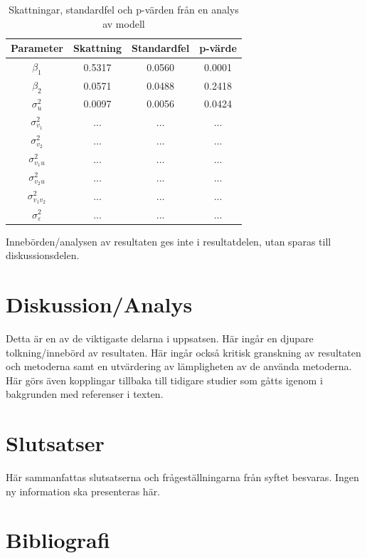 \documentclass[10pt,swedish]{book}
\begin{document}
\begin{table}[H]
\begin{centering}
\begin{tabular}{|c|c|c|c|}
\hline 
Parameter &
Skattning &
Standardfel &
p-värde\tabularnewline
\hline 
\hline 
$\beta_{1}$ &
0.5317 &
0.0560 &
0.0001\tabularnewline
\hline 
$\beta_{2}$ &
0.0571 &
0.0488 &
0.2418\tabularnewline
\hline 
$\sigma_{u}^{2}$ &
0.0097 &
0.0056 &
0.0424\tabularnewline
\hline 
$\sigma_{v_{1}}^{2}$ &
... &
... &
...\tabularnewline
\hline 
$\sigma_{v_{2}}^{2}$ &
... &
... &
...\tabularnewline
\hline 
$\sigma_{v_{1}u}^{2}$ &
... &
... &
...\tabularnewline
\hline 
$\sigma_{v_{2}u}^{2}$ &
... &
... &
...\tabularnewline
\hline 
$\sigma_{v_{1}v_{2}}^{2}$ &
... &
... &
...\tabularnewline
\hline 
$\sigma_{\varepsilon}^{2}$ &
... &
... &
...\tabularnewline
\hline 
\end{tabular}
\par\end{centering}
\caption{Skattningar, standardfel och p-värden från en analys av modell }
\label{Table Estimates}
\end{table}

Innebörden/analysen av resultaten ges inte i resultatdelen, utan sparas
till diskussionsdelen.

\clearpage{}

\chapter{Diskussion/Analys}

Detta är en av de viktigaste delarna i uppsatsen. Här ingår en djupare
tolkning/innebörd av resultaten. Här ingår också kritisk granskning
av resultaten och metoderna samt en utvärdering av lämpligheten av
de använda metoderna. Här görs även kopplingar tillbaka till tidigare
studier som gåtts igenom i bakgrunden med referenser i texten. 

\clearpage{}

\chapter{Slutsatser}

Här sammanfattas slutsatserna och frågeställningarna från syftet besvaras.
Ingen ny information ska presenteras här.

\clearpage{}

\chapter*{Bibliografi}
\end{document}
